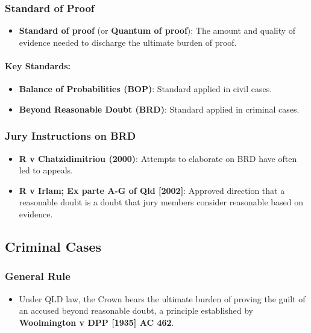 \subsubsection{Standard of Proof}\label{standard-of-proof}

\begin{itemize}
\tightlist
\item
  \textbf{Standard of proof} (or \textbf{Quantum of proof}): The amount
  and quality of evidence needed to discharge the ultimate burden of
  proof.
\end{itemize}

\paragraph{Key Standards:}\label{key-standards}

\begin{itemize}
\tightlist
\item
  \textbf{Balance of Probabilities (BOP)}: Standard applied in civil
  cases.
\item
  \textbf{Beyond Reasonable Doubt (BRD)}: Standard applied in criminal
  cases.
\end{itemize}

\subsubsection{Jury Instructions on BRD}\label{jury-instructions-on-brd}

\begin{itemize}
\tightlist
\item
  \textbf{R v Chatzidimitriou (2000)}: Attempts to elaborate on BRD have
  often led to appeals.
\item
  \textbf{R v Irlam; Ex parte A-G of Qld {[}2002{]}}: Approved direction
  that a reasonable doubt is a doubt that jury members consider
  reasonable based on evidence.
\end{itemize}

\subsection{Criminal Cases}\label{criminal-cases}

\subsubsection{General Rule}\label{general-rule}

\begin{itemize}
\tightlist
\item
  Under QLD law, the Crown bears the ultimate burden of proving the
  guilt of an accused beyond reasonable doubt, a principle established
  by \textbf{Woolmington v DPP {[}1935{]} AC 462}.
\end{itemize}


